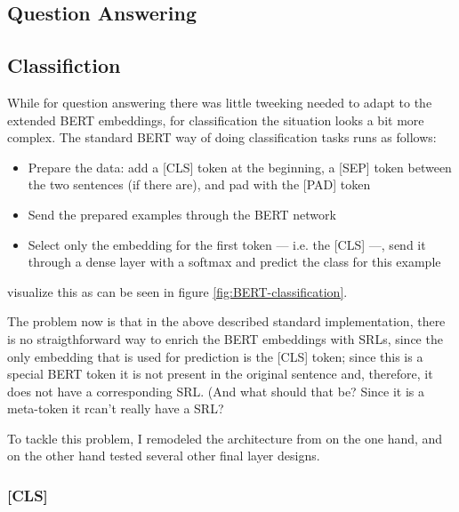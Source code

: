 \subsection{Question Answering}

\subsection{Classifiction}

While for question answering there was little tweeking needed to adapt to the extended BERT embeddings, for classification the situation looks a bit more complex.
The standard BERT way of doing classification tasks runs as follows:

\begin{itemize}
  \item Prepare the data: add a [CLS] token at the beginning, a [SEP] token between the two sentences (if there are), and pad with the [PAD] token
  \item Send the prepared examples through the BERT network
  \item Select only the embedding for the first token  --- i.e. the [CLS] ---, send it through a dense layer with a softmax and predict the class for this example
\end{itemize}

\cite{devlin2018bert} visualize this as can be seen in figure \ref{fig:BERT-classification}.



The problem now is that in the above described standard implementation, there is no straigthforward way to enrich the BERT embeddings with SRLs, since the only embedding that is used for prediction is the [CLS] token;
since this is a special BERT token it is not present in the original sentence and, therefore, it does not have a corresponding SRL.
(And what should that be? Since it is a meta-token it rcan't really have a SRL?

To tackle this problem, I remodeled the architecture from \cite{zhang2019semantics} on the one hand, and on the other hand tested several other final layer designs.

\subsubsection{[CLS]}

